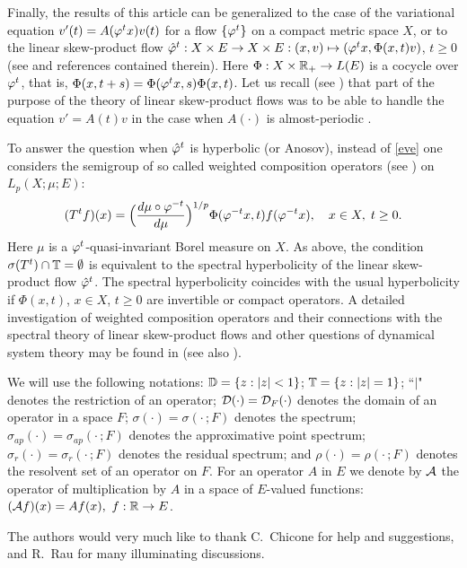 Finally, the results of this article can be generalized to the case of the
variational equation $v'(t) =A(\varphi^t x)v(t)$ for a flow $\{\varphi^t\}$
on a compact metric space $X$, or to the linear skew-product flow $\hat
{\varphi}^t: X \times E \to X \times E: (x,v) \mapsto (\varphi^t x, \Phi
(x,t)v)$, $t\geq 0$ (see \cite{6,12,18,29,30} and references contained
therein).  Here $\Phi : X \times {\Bbb{R}}_+ \to L(E)$ is a cocycle over
$\varphi^t$, that is, $\Phi (x,t+s)=\Phi (\varphi^t x, s) \Phi (x,t)$.  Let
us recall (see \cite{29,30}) that part of the purpose
of the theory of linear skew-product flows was to
be able to handle the equation $v' =A(t) v$ in the case
when $A(\cdot)$ is almost-periodic .

To answer the question when $\hat
{\varphi}^t$ is hyperbolic (or Anosov), instead of \eqref{eve} one considers
the semigroup of so called weighted composition operators (see
\cite{6,15,18}) on $L_p(X;\mu;E)$:
\begin{equation}
(T^t f)(x) =\Big( \dfrac{d\mu \circ \vphi^{-t}}{d\mu}\Big)^{1/p} \Phi
(\vphi^{-t}x,t)f(\vphi^{-t} x), \quad x\in X,\; t \geq 0.
\lb{4}
\end{equation}
Here $\mu$ is a $\varphi^t$-quasi-invariant Borel measure on $X$.  As
above, the condition $\sigma (T^t) \cap {\Bbb{T}} =\emptyset$ is equivalent to
the spectral hyperbolicity of the linear skew-product flow $\hat
{\varphi}^t$.  The spectral hyperbolicity coincides with the usual
hyperbolicity if $\Phi (x,t)$, $x\in X$, $t\geq 0$ are invertible or
compact operators.  A detailed investigation of weighted composition
operators and their connections with the spectral theory of linear
skew-product flows and other questions of dynamical system theory may be
found in \cite{18} (see also \cite{27}).

We will use the following notations: ${\Bbb{D}}=\{z:|z| < 1\}$;
${\Bbb{T}}=\{z:|z|=1\}$;
``$\Big|$" denotes the restriction of an operator;
${\cal{D}}(\cdot)={\cal{D}}_F(\cdot)$ denotes the domain of
an operator in a space $F$; $\sigma(\cdot)=\sigma(\cdot\, ; F)$
denotes the spectrum;
$\sigma_{ap}(\cdot)= \sigma_{ap}(\cdot\, ; F)$
denotes the approximative point spectrum;
$\sigma_r(\cdot)=\sigma_r(\cdot\, ; F)$ denotes
the residual spectrum;
and $\rho(\cdot)=\rho(\cdot\, ; F)$ denotes the resolvent
set of an operator on $F$.
For an operator $A$ in $E$ we denote by $\cal A$
the operator of multiplication by $A$ in a space of $E$-valued
functions: $({\cal A}f)(x)=Af(x),~f: {\Bbb{R}}\to E$.

The authors would very much like to thank C.~Chicone for help and
suggestions, and R.~Rau for many illuminating discussions.

